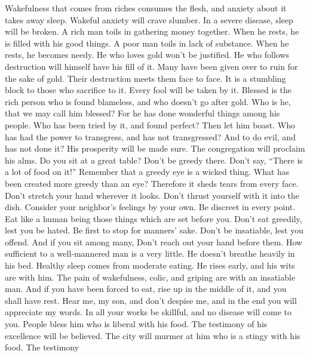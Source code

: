  Wakefulness that comes from riches consumes the flesh, and
anxiety about it takes away sleep.  Wakeful anxiety will
crave slumber. In a severe disease, sleep will be broken.  A
rich man toils in gathering money together. When he rests, he is filled
with his good things.  A poor man toils in lack of
substance. When he rests, he becomes needy.  He who loves
gold won't be justified. He who follows destruction will himself have
his fill of it.  Many have been given over to ruin for the
sake of gold. Their destruction meets them face to face.  It
is a stumbling block to those who sacrifice to it. Every fool will be
taken by it.  Blessed is the rich person who is found
blameless, and who doesn't go after gold.  Who is he, that
we may call him blessed? For he has done wonderful things among his
people.  Who has been tried by it, and found perfect? Then
let him boast. Who has had the power to transgress, and has not
transgressed? And to do evil, and has not done it?  His
prosperity will be made sure. The congregation will proclaim his alms.
 Do you sit at a great table? Don't be greedy there. Don't
say, ``There is a lot of food on it!''  Remember that a
greedy eye is a wicked thing. What has been created more greedy than an
eye? Therefore it sheds tears from every face.  Don't
stretch your hand wherever it looks. Don't thrust yourself with it into
the dish.  Consider your neighbor's feelings by your own.
Be discreet in every point.  Eat like a human being those
things which are set before you. Don't eat greedily, lest you be hated.
 Be first to stop for manners' sake. Don't be insatiable,
lest you offend.  And if you sit among many, Don't reach
out your hand before them.  How sufficient to a
well-mannered man is a very little. He doesn't breathe heavily in his
bed.  Healthy sleep comes from moderate eating. He rises
early, and his wits are with him. The pain of wakefulness, colic, and
griping are with an insatiable man.  And if you have been
forced to eat, rise up in the middle of it, and you shall have rest.
 Hear me, my son, and don't despise me, and in the end you
will appreciate my words. In all your works be skillful, and no disease
will come to you.  People bless him who is liberal with his
food. The testimony of his excellence will be believed. 
The city will murmer at him who is a stingy with his food. The testimony

